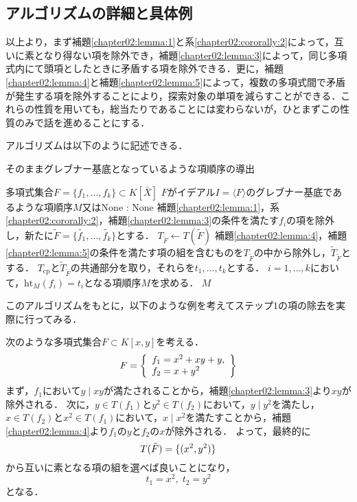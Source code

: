 \subsection{アルゴリズムの詳細と具体例}
以上より，まず補題\ref{chapter02:lemma:1}と系\ref{chapter02:cororally:2}によって，互いに素となり得ない項を除外でき，補題\ref{chapter02:lemma:3}によって，同じ多項式内にて頭項としたときに矛盾する項を除外できる．更に，補題\ref{chapter02:lemma:4}と補題\ref{chapter02:lemma:5}によって，複数の多項式間で矛盾が発生する項を除外することにより，探索対象の単項を減らすことができる．これらの性質を用いても，総当たりであることには変わらないが，ひとまずこの性質のみで話を進めることにする．
\par
アルゴリズムは以下のように記述できる．
\begin{algorithm}
	\label{chapter02:algorithm:1}
	\caption{そのままグレブナー基底となっているような項順序の導出}
	\begin{algorithmic}[1]
		\Require 多項式集合$F=\{f_1, \dots, f_k \} \subset K[\bar{X}]$
		\Ensure $F$がイデアル$I = \langle F \rangle$のグレブナー基底であるような項順序$M$又はNone
		:
			\State \Return None
		\EndIf
		\State 補題\ref{chapter02:lemma:1}，系\ref{chapter02:cororally:2}，補題\ref{chapter02:lemma:3}の条件を満たす$f_i$の項を除外し，新たに$\tilde{F} = \{ \tilde{f_1}, \dots, \tilde{f_k} \}$とする．
		\State $T_{\tilde{F}} \leftarrow T(\tilde{F})$
		\State 補題\ref{chapter02:lemma:4}，補題\ref{chapter02:lemma:5}の条件を満たす項の組を含むものを$T_{\tilde{F}}$の中から除外し，$\tilde{T}_{\tilde{F}}$とする．
		\State $T_{\mathrm{cp}}$と$\tilde{T}_{\tilde{F}}$の共通部分を取り，それらを$t_1, \dots, t_k$とする．
		\State $i = 1, \dots , k$において，$\mathrm{ht}_M(f_i)=t_i$となる項順序$M$を求める．
		\State \Return $M$
	\end{algorithmic}
\end{algorithm}

このアルゴリズムをもとに，以下のような例を考えてステップ1の項の除去を実際に行ってみる．
\begin{example}
	次のような多項式集合$F \subset K[x, y]$を考える．
	\begin{equation}
		F = 
		\left\{
		\begin{array}{l}
			f_1 = x^2 + xy + y, \\
			f_2 = x + y^2 \notag
		\end{array}
		\right\}
	\end{equation}
	まず，$f_1$において$y \mid xy$が満たされることから，補題\ref{chapter02:lemma:3}より$xy$が除外される．
	次に，$y \in T(f_1)$と$y^2 \in T(f_2)$において，$y \mid y^2$を満たし，$x \in T(f_2)$と$x^2 \in T(f_1)$において，$x \mid x^2$を満たすことから，補題\ref{chapter02:lemma:4}より$f_1$の$y$と$f_2$の$x$が除外される．
	よって，最終的に
	\begin{equation}
		T(\tilde{F}) = \{ (x^2, y^2) \} \notag
	\end{equation}
	から互いに素となる項の組を選べば良いことになり，
	$$t_1 = x^2, \; t_2 = y^2$$
	となる．
\end{example}

